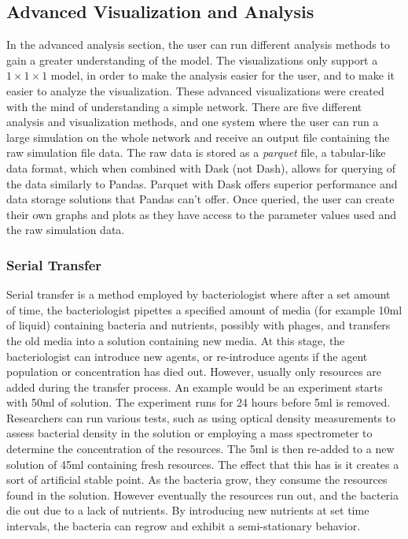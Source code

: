 \subsection{Advanced Visualization and Analysis}
In the advanced analysis section, the user can run different analysis methods to gain a greater understanding of the model.
The visualizations only support a $1 \times 1\times 1$ model, in order to make the analysis easier for the user, and to make it easier to analyze the visualization.
These advanced visualizations were created with the mind of understanding a simple network.
There are five different analysis and visualization methods, and one system where the user can run a large simulation on the whole network and receive an output file containing the raw simulation file data.
The raw data is stored as a \textit{parquet} file, a tabular-like data format, which when combined with Dask (not Dash), allows for querying of the data similarly to Pandas.
Parquet with Dask offers superior performance and data storage solutions that Pandas can't offer.
Once queried, the user can create their own graphs and plots as they have access to the parameter values used and the raw simulation data.

\subsubsection{Serial Transfer}
Serial transfer is a method employed by bacteriologist where after a set amount of time, the bacteriologist pipettes a specified amount of media (for example 10ml of liquid) containing bacteria and nutrients, possibly with phages, and transfers the old media into a solution containing new media.
At this stage, the bacteriologist can introduce new agents, or re-introduce agents if the agent population or concentration has died out.
However, usually only resources are added during the transfer process.
An example would be an experiment starts with 50ml of solution.
The experiment runs for 24 hours before 5ml is removed.
Researchers can run various tests, such as using optical density measurements to assess bacterial density in the solution or employing a mass spectrometer to determine the concentration of the resources.
The 5ml is then re-added to a new solution of 45ml containing fresh resources.
The effect that this has is it creates a sort of artificial stable point.
As the bacteria grow, they consume the resources found in the solution.
However eventually the resources run out, and the bacteria die out due to a lack of nutrients.
By introducing new nutrients at set time intervals, the bacteria can regrow and exhibit a semi-stationary behavior.
\newline

